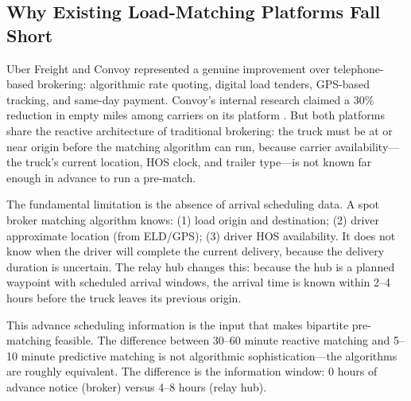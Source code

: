 \subsection{Why Existing Load-Matching Platforms Fall Short}

Uber Freight and Convoy represented a genuine improvement over telephone-based brokering: algorithmic rate quoting, digital load tenders, GPS-based tracking, and same-day payment. Convoy's internal research claimed a 30\% reduction in empty miles among carriers on its platform \citep{ROUTE_C3}. But both platforms share the reactive architecture of traditional brokering: the truck must be at or near origin before the matching algorithm can run, because carrier availability---the truck's current location, HOS clock, and trailer type---is not known far enough in advance to run a pre-match.

The fundamental limitation is the absence of arrival scheduling data. A spot broker matching algorithm knows: (1) load origin and destination; (2) driver approximate location (from ELD/GPS); (3) driver HOS availability. It does not know when the driver will complete the current delivery, because the delivery duration is uncertain. The relay hub changes this: because the hub is a planned waypoint with scheduled arrival windows, the arrival time is known within 2--4 hours before the truck leaves its previous origin.

This advance scheduling information is the input that makes bipartite pre-matching feasible. The difference between 30--60 minute reactive matching and 5--10 minute predictive matching is not algorithmic sophistication---the algorithms are roughly equivalent. The difference is the information window: 0 hours of advance notice (broker) versus 4--8 hours (relay hub).
